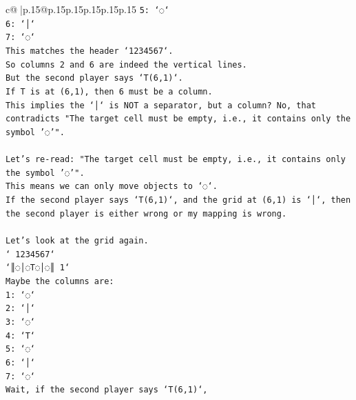 \documentclass{article}
\begin{document}
{\begin{supertabular}{c@{$\;$}|p{.15\linewidth}@{}p{.15\linewidth}p{.15\linewidth}p{.15\linewidth}p{.15\linewidth}p{.15\linewidth}}
{{{\texttt{5: `◌`} \\
\texttt{6: `│`} \\
\texttt{7: `◌`} \\
\texttt{This matches the header `1234567`.} \\
\texttt{So columns 2 and 6 are indeed the vertical lines.} \\
\texttt{But the second player says `T(6,1)`.} \\
\texttt{If T is at (6,1), then 6 must be a column.} \\
\texttt{This implies the `│` is NOT a separator, but a column? No, that contradicts "The target cell must be empty, i.e., it contains only the symbol '◌'".} \\
\\ 
\texttt{Let's re{-}read: "The target cell must be empty, i.e., it contains only the symbol '◌'".} \\
\texttt{This means we can only move objects to `◌`.} \\
\texttt{If the second player says `T(6,1)`, and the grid at (6,1) is `│`, then the second player is either wrong or my mapping is wrong.} \\
\\ 
\texttt{Let's look at the grid again.} \\
\texttt{` 1234567`} \\
\texttt{`║◌│◌T◌│◌║ 1`} \\
\texttt{Maybe the columns are:} \\
\texttt{1: `◌`} \\
\texttt{2: `│`} \\
\texttt{3: `◌`} \\
\texttt{4: `T`} \\
\texttt{5: `◌`} \\
\texttt{6: `│`} \\
\texttt{7: `◌`} \\
\texttt{Wait, if the second player says `T(6,1)`,} \\
            }
        }
    }
     \\ \\


\end{supertabular}}
\end{document}

